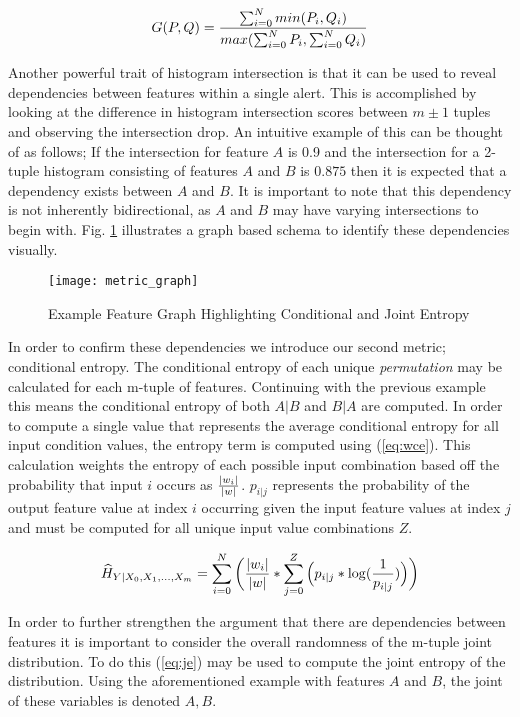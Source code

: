 \begin{equation}
\label{eq:intersection}
G(P,Q) = {{\sum_{i=0}^{N} min(P_i, Q_i)} \over {max(\sum_{i=0}^{N} P_i, \sum_{i=0}^{N} Q_i)}}
\end{equation}

Another powerful trait of histogram intersection is that it can be used to reveal dependencies between features within a single alert. This is accomplished by looking at the difference in histogram intersection scores between $m\pm1$ tuples and observing the intersection drop. An intuitive example of this can be thought of as follows; If the intersection for feature $A$ is 0.9 and the intersection for a 2-tuple histogram consisting of features $A$ and $B$ is $0.875$ then it is expected that a dependency exists between $A$ and $B$. It is important to note that this dependency is not inherently bidirectional, as $A$ and $B$ may have varying intersections to begin with. Fig. \ref{fig:metric_graph} illustrates a graph based schema to identify these dependencies visually. 

\begin{figure}[!htbp]
	\centering%
	\texttt{[image: metric\_graph]}
	\caption{
		Example Feature Graph Highlighting Conditional and Joint Entropy
	}
	\label{fig:metric_graph}
\end{figure}

In order to confirm these dependencies we introduce our second metric; conditional entropy. The conditional entropy of each unique \emph{permutation} may be calculated for each m-tuple of features. Continuing with the previous example this means the conditional entropy of both $A|B$ and $B|A$ are computed. In order to compute a single value that represents the average conditional entropy for all input condition values, the entropy term is computed using (\ref{eq:wce}). This calculation weights the entropy of each possible input combination based off the probability that input $i$ occurs as ${{|w_i|} \over {|w|}}$. ${p_{i|j}}$ represents the probability of the output feature value at index $i$ occurring given the input feature values at index $j$ and must be computed for all unique input value combinations $Z$.

\begin{equation}
\label{eq:wce}
\widehat{H}_{Y|X_0, X_1, ..., X_m} = \sum_{i=0}^{N} \bigg({{|w_i|} \over {|w|}} * {\sum_{j=0}^{Z}\Big({p_{i|j} * \log ({1 \over{p_{i|j}}})}\Big)}\bigg)
\end{equation}

In order to further strengthen the argument that there are dependencies between features it is important to consider the overall randomness of the m-tuple joint distribution. To do this (\ref{eq:je}) may be used to compute the joint entropy of the distribution. Using the aforementioned example with features $A$ and $B$, the joint of these variables is denoted $A,B$.

